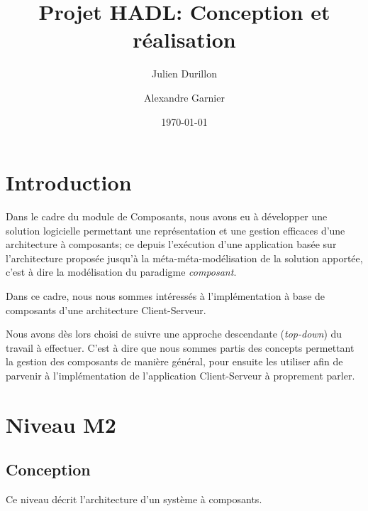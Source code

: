 \documentclass[a4paper, titlepage]{article}
\title{Projet HADL: Conception et réalisation}
\author{Julien Durillon \and Alexandre Garnier}
\date{\today}
\begin{document}
	\maketitle

	\tableofcontents\clearpage
	
	\section*{Introduction}

	  Dans le cadre du module de Composants, nous avons eu à développer une
	  solution logicielle permettant une représentation et une gestion efficaces
	  d'une architecture à composants; ce depuis l'exécution d'une application
	  basée sur l'architecture proposée jusqu'à la méta-méta-modélisation de la
	  solution apportée, c'est à dire la modélisation du paradigme
	  \emph{composant}.

    Dans ce cadre, nous nous sommes intéressés à l'implémentation à base de
    composants d'une architecture Client-Serveur.
    
    Nous avons dès lors choisi de suivre une approche descendante
    (\emph{top-down}) du travail à effectuer. C'est à dire que nous sommes
    partis des concepts permettant la gestion des composants de manière général,
    pour ensuite les utiliser afin de parvenir à l'implémentation de
    l'application Client-Serveur à proprement parler.

	\section{Niveau M2}
		\subsection{Conception}
			Ce niveau décrit l'architecture d'un système à composants.
		
\end{document}
